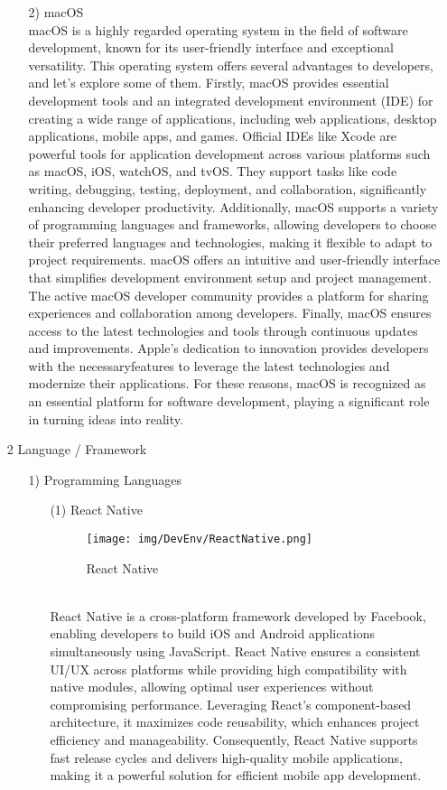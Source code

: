 \documentclass[conference]{IEEEtran}
\begin{document}
\begin{enumerate}
\begin{itemize}
\item [2)] macOS\\
macOS is a highly regarded operating system in the field of software development, known for its user-friendly interface and exceptional versatility. This operating system offers several advantages to developers, and let’s explore some of them. Firstly, macOS provides essential development tools and an integrated development environment (IDE) for creating a wide range of applications, including web applications, desktop applications, mobile apps, and games. Official IDEs like Xcode are powerful tools for application development across various platforms such as macOS, iOS, watchOS, and tvOS. They support tasks like code writing, debugging, testing, deployment, and collaboration, significantly enhancing developer productivity. Additionally, macOS supports a variety of programming languages and frameworks, allowing developers to choose their preferred languages and technologies, making it flexible to adapt to project requirements. macOS offers an intuitive and user-friendly interface that simplifies development environment setup and project management. The active macOS developer community provides a platform for sharing experiences and collaboration among developers. Finally, macOS ensures access to the latest technologies and tools through continuous updates and improvements. Apple’s dedication to innovation provides developers with the necessaryfeatures to leverage the latest technologies and modernize their applications. For these reasons, macOS is recognized as an essential platform for software development, playing a significant role in turning ideas into reality.
\\
\end{itemize}

\item[2] Language / Framework

\begin{itemize}
\item [1)] Programming Languages
\begin{itemize}
\item [(1)] React Native\cite{ReactNative}
\begin{figure}[h]
\centering
\texttt{[image: img/DevEnv/ReactNative.png]}
\centering
\caption{React Native} 
\end{figure}\\
React Native is a cross-platform framework developed by Facebook, enabling developers to build iOS and Android applications simultaneously using JavaScript. React Native ensures a consistent UI/UX across platforms while providing high compatibility with native modules, allowing optimal user experiences without compromising performance. Leveraging React's component-based architecture, it maximizes code reusability, which enhances project efficiency and manageability. Consequently, React Native supports fast release cycles and delivers high-quality mobile applications, making it a powerful solution for efficient mobile app development.\\


\end{itemize}
\end{itemize}
\end{enumerate}
\end{document}
